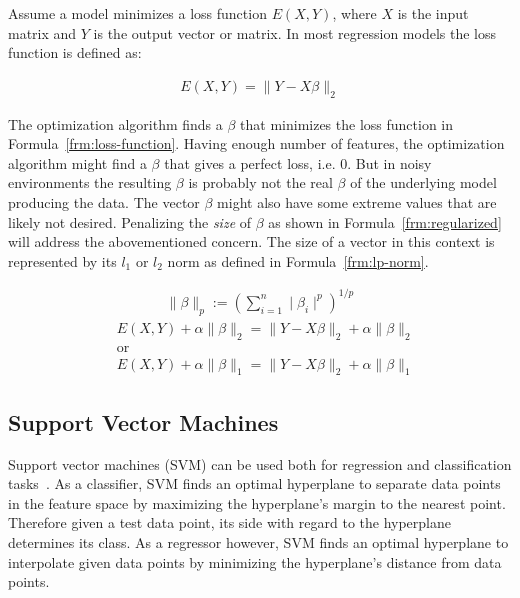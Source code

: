 Assume a model minimizes a loss function $E(X, Y)$, where $X$ is the input matrix and $Y$ is the output vector or matrix. In most regression models the loss function is defined as:

\begin{align}
  E(X, Y) = \parallel Y - X \beta \parallel_2
  \label{frm:loss-function}
\end{align}

The optimization algorithm finds a $\beta$ that minimizes the loss function in Formula~\ref{frm:loss-function}. Having enough number of features, the optimization algorithm might find a $\beta$ that gives a perfect loss, i.e. 0. But in noisy environments the resulting $\beta$ is probably not the real $\beta$ of the underlying model producing the data. The vector $\beta$ might also have some extreme values that are likely not desired. Penalizing the \emph{size} of $\beta$ as shown in Formula~\ref{frm:regularized} will address the abovementioned concern. The size of a vector in this context is represented by its $l_1$ or $l_2$ norm as defined in Formula~\ref{frm:lp-norm}.


\begin{align}
  \parallel \beta \parallel_p := \left(\sum\limits_{i=1}^n \mid \beta_i \mid^p \right)^{1/p}
  \label{frm:lp-norm}
\end{align}
\begin{align}
  &E(X, Y) + \alpha \parallel \beta \parallel_2 = \parallel Y - X \beta \parallel_2 + \alpha \parallel \beta \parallel_2 \nonumber \\
  &\text{or} \nonumber \\
  &E(X, Y) + \alpha \parallel \beta \parallel_1 = \parallel Y - X \beta \parallel_2 + \alpha \parallel \beta \parallel_1
  \label{frm:regularized}
\end{align}

\subsection{Support Vector Machines}
\label{sec:svms}

Support vector machines (SVM) can be used both for regression and classification tasks~\cite{svm2, svr1}. As a classifier, SVM finds an optimal hyperplane to separate data points in the feature space by maximizing the hyperplane's margin to the nearest point. Therefore given a test data point, its side with regard to the hyperplane determines its class. As a regressor however, SVM finds an optimal hyperplane to interpolate given data points by minimizing the hyperplane's distance from data points.

